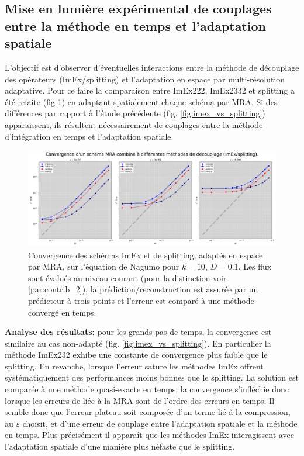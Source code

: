 \subsection{Mise en lumière expérimental de couplages entre la méthode en temps et l'adaptation spatiale}
\label{par:couplage_temps_adaptation}
L'objectif est d'observer d'éventuelles interactions entre la méthode de découplage des opérateurs (ImEx/splitting) et l'adaptation en espace par multi-résolution adaptative.
Pour ce faire la comparaison entre ImEx222, ImEx2332 et splitting a été refaite (fig \ref{fig:couplage-MRA-temps}) en adaptant spatialement chaque schéma par MRA.
Si des différences par rapport à l'étude précédente (fig. \ref{fig:imex_vs_splitting}) apparaissent, ils résultent nécessairement de couplages entre la méthode d'intégration en temps
et l'adaptation spatiale.
\begin{figure}[htbp!]
    \centering
    \includegraphics[width=\linewidth]{media/4_travail/2_nagumo/couplage/couplage_MRA_temps.pdf}
    \caption{Convergence des schémas ImEx et de splitting, adaptés en espace par MRA, sur l'équation de Nagumo pour $k=10$, $D=0.1$.
    Les flux sont évalués au niveau courant (pour la distinction voir \ref{par:contrib_2}), la prédiction/reconstruction est assurée par un prédicteur à trois points et l'erreur est comparé à une méthode convergé en temps.}
    \label{fig:couplage-MRA-temps}
\end{figure}
\textbf{Analyse des résultats:} pour les grands pas de temps, la convergence est similaire au cas non-adapté (fig. \ref{fig:imex_vs_splitting}). En particulier la méthode
ImEx232 exhibe une constante de convergence plus faible que le splitting. 
En revanche, lorsque l'erreur sature les méthodes ImEx offrent systématiquement des performances moins bonnes que le splitting.
La solution est comparée à une méthode quasi-exacte en temps, la convergence s'infléchie donc lorsque les erreurs de liée à la MRA sont de l'ordre des erreurs en temps.
Il semble donc que l'erreur plateau soit composée d'un terme lié à la compression, au $\varepsilon$ choisit, et d'une erreur de couplage entre l'adaptation spatiale
et la méthode en temps. Plus précisément il apparaît que les méthodes ImEx interagissent avec l'adaptation spatiale d'une manière plus néfaste que le splitting.\\
